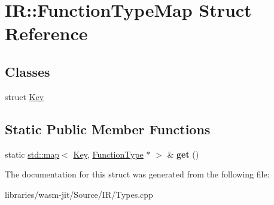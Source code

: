 \hypertarget{struct_i_r_1_1_function_type_map}{}\section{IR\+:\+:Function\+Type\+Map Struct Reference}
\label{struct_i_r_1_1_function_type_map}
\subsection*{Classes}
\begin{DoxyCompactItemize}
\item 
struct \mbox{\hyperlink{struct_i_r_1_1_function_type_map_1_1_key}{Key}}
\end{DoxyCompactItemize}
\subsection*{Static Public Member Functions}
\begin{DoxyCompactItemize}
\item 
\mbox{\label{struct_i_r_1_1_function_type_map_ab49e2ad05df36a5db005491292f75899}} 
static \mbox{\hyperlink{classstd_1_1map}{std\+::map}}$<$ \mbox{\hyperlink{struct_i_r_1_1_function_type_map_1_1_key}{Key}}, \mbox{\hyperlink{struct_i_r_1_1_function_type}{Function\+Type}} $\ast$ $>$ \& {\bfseries get} ()
\end{DoxyCompactItemize}


The documentation for this struct was generated from the following file\+:\begin{DoxyCompactItemize}
\item 
libraries/wasm-\/jit/\+Source/\+I\+R/Types.\+cpp\end{DoxyCompactItemize}
